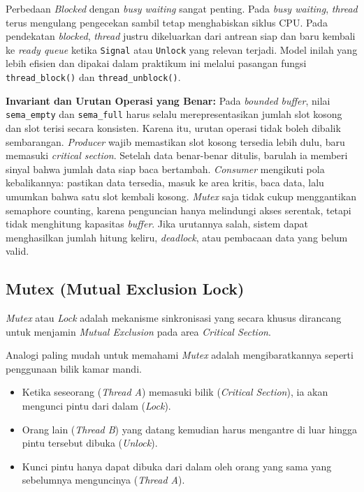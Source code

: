 Perbedaan \textit{Blocked} dengan \textit{busy waiting} sangat penting. Pada \textit{busy waiting}, \textit{thread} terus mengulang pengecekan sambil tetap menghabiskan siklus CPU. Pada pendekatan \textit{blocked}, \textit{thread} justru dikeluarkan dari antrean siap dan baru kembali ke \textit{ready queue} ketika \texttt{Signal} atau \texttt{Unlock} yang relevan terjadi. Model inilah yang lebih efisien dan dipakai dalam praktikum ini melalui pasangan fungsi \texttt{thread\_block()} dan \texttt{thread\_unblock()}.


\noindent \textbf{Invariant dan Urutan Operasi yang Benar:} Pada \textit{bounded buffer}, nilai \texttt{sema\_empty} dan \texttt{sema\_full} harus selalu merepresentasikan jumlah slot kosong dan slot terisi secara konsisten. Karena itu, urutan operasi tidak boleh dibalik sembarangan. \textit{Producer} wajib memastikan slot kosong tersedia lebih dulu, baru memasuki \textit{critical section}. Setelah data benar-benar ditulis, barulah ia memberi sinyal bahwa jumlah data siap baca bertambah. \textit{Consumer} mengikuti pola kebalikannya: pastikan data tersedia, masuk ke area kritis, baca data, lalu umumkan bahwa satu slot kembali kosong. \textit{Mutex} saja tidak cukup menggantikan semaphore counting, karena penguncian hanya melindungi akses serentak, tetapi tidak menghitung kapasitas \textit{buffer}. Jika urutannya salah, sistem dapat menghasilkan jumlah hitung keliru, \textit{deadlock}, atau pembacaan data yang belum valid.

\subsection{Mutex (Mutual Exclusion Lock)}

\textit{Mutex} atau \textit{Lock} adalah mekanisme sinkronisasi yang secara khusus dirancang untuk menjamin \textit{Mutual Exclusion} pada area \textit{Critical Section}.

Analogi paling mudah untuk memahami \textit{Mutex} adalah mengibaratkannya seperti penggunaan bilik kamar mandi.
\begin{itemize}
	\item Ketika seseorang (\textit{Thread A}) memasuki bilik (\textit{Critical Section}), ia akan mengunci pintu dari dalam (\textit{Lock}).
	\item Orang lain (\textit{Thread B}) yang datang kemudian harus mengantre di luar hingga pintu tersebut dibuka (\textit{Unlock}).
	\item Kunci pintu hanya dapat dibuka dari dalam oleh orang yang sama yang sebelumnya menguncinya (\textit{Thread A}).
\end{itemize}

